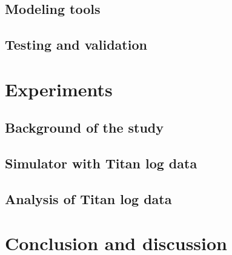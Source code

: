 \documentclass[twocolumn]{svjour3}           %
\begin{document}
\subsection{Modeling tools}
\label{sec-strategy-2}


%

%

\subsection{Testing and validation}
\label{sec-strategy-3}



\section{Experiments}
\label{sec-experiments}

\subsection{Background of the study}
\label{sec-experiments-1}


\subsection{Simulator with Titan log data}
\label{sec-experiments-2}


\subsection{Analysis of Titan log data}
\label{sec-experiments-3}



\section{Conclusion and discussion}
\label{sec-conclusions}

\end{document}
